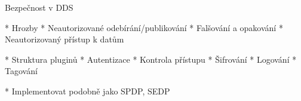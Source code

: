 \sec Bezpečnost v DDS

* Hrozby
\begitems
* Neautorizované odebírání/publikování
* Falšování a opakování
* Neautorizovaný přístup k datům
\enditems

* Struktura pluginů
\begitems
* Autentizace
* Kontrola přístupu
* Šifrování
* Logování
* Tagování
\enditems

* Implementovat podobně jako SPDP, SEDP

